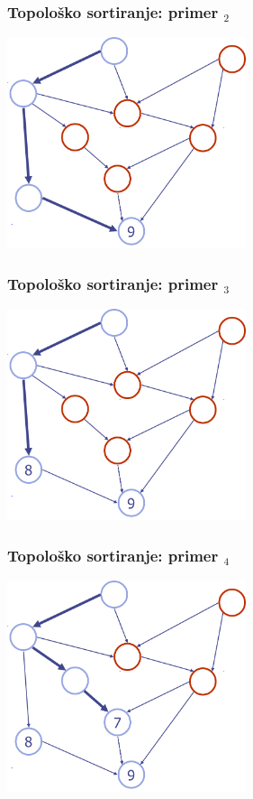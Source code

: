 \documentclass[compress,aspectratio=169]{beamer}
\begin{document}
\begin{frame}[fragile]
  \frametitle{Topološko sortiranje: primer $_2$}
  \begin{center}
    \includegraphics[width=7cm]{asp-14-pic49.png}
  \end{center}
\end{frame}

\begin{frame}[fragile]
  \frametitle{Topološko sortiranje: primer $_3$}
  \begin{center}
    \includegraphics[width=7cm]{asp-14-pic50.png}
  \end{center}
\end{frame}

\begin{frame}[fragile]
  \frametitle{Topološko sortiranje: primer $_4$}
  \begin{center}
    \includegraphics[width=7cm]{asp-14-pic51.png}
  \end{center}
\end{frame}
\end{document}
